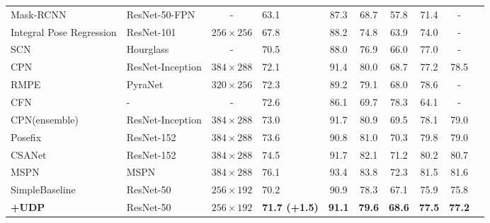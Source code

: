 \documentclass[10pt,journal,compsoc]{IEEEtran}
\begin{document}
\begin{table*}
\begin{center}
\begin{tabular}{l|l|c|lcccccc}
\hline
Mask-RCNN\cite{Mask-RCNN}          & ResNet-50-FPN\cite{FPN}    &-          &63.1 & 87.3             & 68.7             & 57.8                   &71.4                   &-   \\
Integral Pose Regression\cite{IPR} & ResNet-101\cite{Resnet}&$256\times 256$&67.8 & 88.2             & 74.8             & 63.9                   &74.0                   &-   \\
SCN\cite{SCN}                      & Hourglass\cite{Hourglass}  &-          &70.5 & 88.0             & 76.9             & 66.0                   &77.0                   &-   \\
CPN\cite{CPN}                      & ResNet-Inception &$384\times288$       &72.1 & 91.4             & 80.0             & 68.7                   &77.2                   &78.5\\
RMPE\cite{RMPE}                    & PyraNet\cite{PyraNet}&$320\times 256$  &72.3 & 89.2             & 79.1             & 68.0                   &78.6                   &-   \\
CFN\cite{CFN}                      & -                &-                    &72.6 & 86.1             & 69.7             & 78.3                   &64.1                   &-   \\
CPN(ensemble)\cite{CPN}            & ResNet-Inception &$384\times 288$      &73.0 & 91.7             & 80.9             & 69.5                   &78.1                   &79.0\\
Posefix\cite{Posefix}              & ResNet-152       &$384\times288$       &73.6 & 90.8             & 81.0             & 70.3                   &79.8                   &79.0\\
CSANet\cite{CSANet}                & ResNet-152       &$384\times288$       &74.5 & 91.7             & 82.1             & 71.2                   &80.2                   &80.7\\
MSPN\cite{MSPN}                    & MSPN\cite{MSPN}  &$384\times288$       &76.1 & 93.4             & 83.8             & 72.3                   &81.5                   &81.6\\
\hline
SimpleBaseline\cite{CPN}           & ResNet-50     &$256\times192$       &70.2      & 90.9             & 78.3             & 67.1            &75.9            &75.8\\
\textbf{+UDP}                                         & ResNet-50     &$256\times192$       &\textbf{71.7 (+1.5)}    &\textbf{91.1}           &\textbf{79.6}           &\textbf{68.6}         &\textbf{77.5}          &\textbf{77.2}\\

\end{tabular}
\end{center}
\end{table*}
\end{document}
